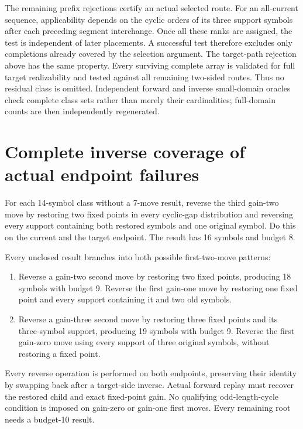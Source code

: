 \documentclass[11pt,a4paper]{article}
\begin{document}
The remaining prefix rejections certify an actual selected route. For an
all-current sequence, applicability depends on the cyclic orders of its three
support symbols after each preceding segment interchange. Once all these ranks
are assigned, the test is independent of later placements. A successful test
therefore excludes only completions already covered by the selection argument.
The target-path rejection above has the same property. Every surviving complete
array is validated for full target realizability and tested against all
remaining two-sided routes. Thus no residual class is omitted. Independent
forward and inverse small-domain oracles check complete class sets rather than
merely their cardinalities; full-domain counts are then independently regenerated.

\section{Complete inverse coverage of actual endpoint failures}
For each 14-symbol class without a 7-move result, reverse the
third gain-two move by restoring two fixed points in every cyclic-gap
distribution and reversing every support containing both restored symbols and
one original symbol. Do this on the current and the target endpoint. The
result has 16 symbols and budget 8.

Every unclosed result branches into both possible first-two-move patterns:
\begin{enumerate}
\item Reverse a gain-two second move by restoring two fixed points, producing
18 symbols with budget 9. Reverse the first gain-one move by
restoring one fixed point and every support containing it and two old symbols.
\item Reverse a gain-three second move by restoring three fixed points and its
three-symbol support, producing 19 symbols with budget 9. Reverse
the first gain-zero move using every support of three original symbols, without
restoring a fixed point.
\end{enumerate}
Every reverse operation is performed on both endpoints, preserving their
identity by swapping back after a target-side inverse. Actual forward replay
must recover the restored child and exact fixed-point gain. No qualifying
odd-length-cycle condition is imposed on gain-zero or gain-one first moves.
Every remaining root needs a budget-10 result.
\end{document}
